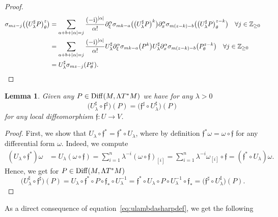 \documentclass[pdftex]{sigma}
\numberwithin{equation}{section}
\newtheorem{lem}[thm]{Lemma}
\theoremstyle{definition}
\newcommand{\Z}{\mathbb Z}
\begin{document}
\begin{proof}
\begin{align*}
\sigma_{mz-j}\bigl(\bigl(U_\lambda^\sharp P\bigr)_\theta^z\bigr)&{}= \sum_{a+b+\vert \alpha\vert=j} \frac{(-{\rm i})^{\vert \alpha \vert}}{\alpha!} \partial_\xi^\alpha \sigma_{mk-a} \bigl(\bigl(U_\lambda^\sharp P\bigr)^k\bigr) \partial_x^\alpha\sigma_{m(z-k)-b}\bigl( \bigl(U_\lambda^\sharp P\bigr)_\theta^{z-k}\bigr)\quad \forall j\in \Z_{\geq 0}\\
&{}= \sum_{a+b+\vert \alpha\vert=j} \frac{(-{\rm i})^{\vert \alpha \vert}}{\alpha!} U_\lambda^\sharp\partial_\xi^\alpha \sigma_{mk-a} \bigl(P^k\bigr) U_\lambda^\sharp\partial_x^\alpha\sigma_{m(z-k)-b}\bigl( P_\theta^{z-k}\bigr)\quad \forall j\in \Z_{\geq 0}\\
&{}= U_\lambda^\sharp \sigma_{mz-j}( P_\theta^z).
\tag*{\qed}
\end{align*}
\renewcommand{\qed}{}
\end{proof}
\begin{lem} %
Given any $P\in {\rm Diff}(M,\Lambda T^*M)$ we have for any $\lambda>0$
\begin{equation}\label{eq:flambdaUlambda}
\bigl(U_\lambda^\sharp\circ\mathfrak{f}^\sharp\bigr)(P)=\bigl(\mathfrak{f}^\sharp\circ U_\lambda^\sharp\bigr)(P)
\end{equation}
for any local diffeomorphism $\mathfrak{f}\colon U\to V$.
\end{lem}
\begin{proof} First, we show that $U_\lambda\circ \mathfrak{f}^*=\mathfrak{f}^*\circ U_\lambda$, where by definition $\mathfrak{f}^*\omega=\omega\circ \mathfrak{f}$ for any differential form $\omega$. Indeed, we compute
\begin{align*}
(U_\lambda\circ \mathfrak{f}^*)\omega&{}=U_\lambda(\omega\circ \mathfrak{f})
=\sum_{i=1}^n \lambda^{-i}(\omega\circ \mathfrak{f})_{[i]}=\sum_{i=1}^n \lambda^{-i}\omega_{[i]}\circ \mathfrak{f}
=(\mathfrak{f}^*\circ U_\lambda)\omega.
\end{align*}
Hence, we get for $P\in {\rm Diff}(M,\Lambda T^*M)$
\[
\bigl(U_\lambda^\sharp\circ \mathfrak{f}^\sharp\bigr)(P)=U_\lambda\circ \mathfrak{f}^* \circ P\circ \mathfrak{f}_*\circ U_\lambda^{-1}=\mathfrak{f}^* \circ U_\lambda\circ P\circ U_\lambda^{-1}\circ \mathfrak{f}_*=\bigl(\mathfrak{f}^\sharp \circ U_\lambda^\sharp\bigr)(P).
\tag*{\qed}
\]
\renewcommand{\qed}{}
\end{proof}

As a direct consequence of equation~\eqref{eq:ulambdasharpdef}, we get the following
\end{document}
